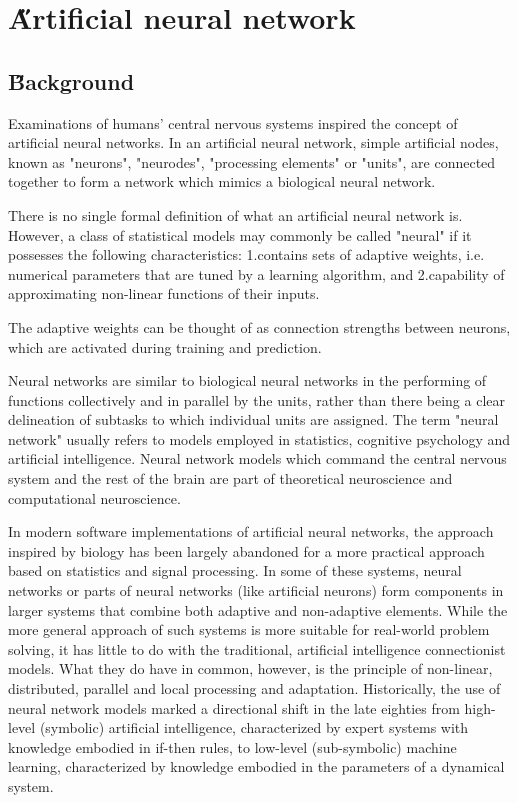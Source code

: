 \documentclass[12pt]{article}
\begin{document}
\section{\H Artificial neural network}
\subsection{\H Background}
Examinations of humans' central nervous systems inspired the concept of artificial neural networks. In an artificial neural network, simple artificial nodes, known as "neurons", "neurodes", "processing elements" or "units", are connected together to form a network which mimics a biological neural network.

There is no single formal definition of what an artificial neural network is. However, a class of statistical models may commonly be called "neural" if it possesses the following characteristics:
1.contains sets of adaptive weights, i.e. numerical parameters that are tuned by a learning algorithm, and
2.capability of approximating non-linear functions of their inputs.

The adaptive weights can be thought of as connection strengths between neurons, which are activated during training and prediction.

Neural networks are similar to biological neural networks in the performing of functions collectively and in parallel by the units, rather than there being a clear delineation of subtasks to which individual units are assigned. The term "neural network" usually refers to models employed in statistics, cognitive psychology and artificial intelligence. Neural network models which command the central nervous system and the rest of the brain are part of theoretical neuroscience and computational neuroscience.\cite{wiki:002}

In modern software implementations of artificial neural networks, the approach inspired by biology has been largely abandoned for a more practical approach based on statistics and signal processing. In some of these systems, neural networks or parts of neural networks (like artificial neurons) form components in larger systems that combine both adaptive and non-adaptive elements. While the more general approach of such systems is more suitable for real-world problem solving, it has little to do with the traditional, artificial intelligence connectionist models. What they do have in common, however, is the principle of non-linear, distributed, parallel and local processing and adaptation. Historically, the use of neural network models marked a directional shift in the late eighties from high-level (symbolic) artificial intelligence, characterized by expert systems with knowledge embodied in if-then rules, to low-level (sub-symbolic) machine learning, characterized by knowledge embodied in the parameters of a dynamical system.
\end{document}

